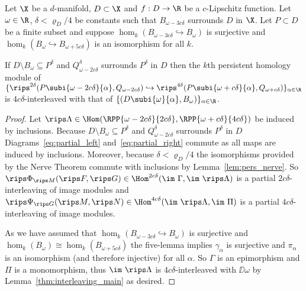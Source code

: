 \begin{theorem}\label{thm:interleaving_main_2}
  Let $\X$ be a $d$-manifold, $D\subset\X$ and $f : D\to\R$ be a $c$-Lipschitz function.
  Let $\omega\in\R$, $\delta < \varrho_D/4$ be constants such that $B_{\omega-3c\delta}$ surrounds $D$ in $\X$.
  Let $P\subset D$ be a finite subset and suppose $\hom_k(B_{\omega-3c\delta}\hookrightarrow B_\omega)$ is surjective and $\hom_k(B_\omega\hookrightarrow B_{\omega+5c\delta})$ is an isomorphism for all $k$.

  If $D\setminus B_\omega\subseteq P^\delta$ and $Q_{\omega-2c\delta}^\delta$ surrounds $P^\delta$ in $D$ then the $k$th persistent homology module of $\{\rips^{2\delta}(P\subi{\omega-2c\delta}{\alpha}, Q_{\omega-2c\delta})\hookrightarrow \rips^{4\delta}(P\subi{\omega+c\delta}{\alpha}, Q_{\omega+c\delta})\}_{\alpha\in\R}$ is $4c\delta$-interleaved with that of $\{(D\subi{\omega}{\alpha}, B_\omega)\}_{\alpha\in\R}$.
\end{theorem}
\begin{proof}
  Let $\rips\Lambda \in\Hom(\RPP{\omega-2c\delta}{2c\delta}, \RPP{\omega+c\delta}{4c\delta})$ be induced by inclusions.
  Because $D\setminus B_\omega\subseteq P^\delta$ and $Q_{\omega-2c\delta}^\delta$ surrounds $P^\delta$ in $D$ Diagrams~\ref{eq:partial_left} and~\ref{eq:partial_right} commute as all maps are induced by inclusions.
  Moreover, because $\delta < \varrho_D/4$ the isomorphisms provided by the Nerve Theorem commute with inclusions by Lemma~\ref{lem:pers_nerve}.
  So $\rips \Phi_{\rips M}(\rips F, \rips G)\in\Hom^{2c\delta}(\im~\Gamma,\im~\rips\Lambda)$ is a partial $2c\delta$-interleaving of image modules and $\rips \Psi_{\rips G} (\rips M,\rips N)\in\Hom^{4c\delta}(\im~\rips\Lambda, \im~\Pi)$ is a partial $4c\delta$-interleaving of image modules.

  As we have assumed that $\hom_k(B_{\omega-3c\delta}\hookrightarrow B_\omega)$ is surjective and $\hom_k(B_\omega)\cong\hom_k(B_{\omega+5c\delta})$ the five-lemma implies $\gamma_\alpha$ is surjective and $\pi_\alpha$ is an isomorphism (and therefore injective) for all $\alpha$.
  So $\Gamma$ is an epimorphism and $\Pi$ is a monomorphism, thus $\im~\rips\Lambda$ is $4c\delta$-interleaved with $\DD{\omega}$ by Lemma~\ref{thm:interleaving_main} as desired.
\end{proof}
